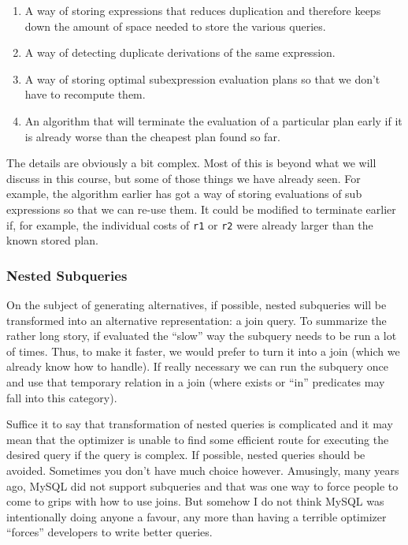 \documentclass[a4paper]{report}
\begin{document}
\begin{enumerate}
	\item A way of storing expressions that reduces duplication and therefore keeps down the amount of space needed to store the various queries.
	\item A way of detecting duplicate derivations of the same expression.
	\item A way of storing optimal subexpression evaluation plans so that we don't have to recompute them.
	\item An algorithm that will terminate the evaluation of a particular plan early if it is already worse than the cheapest plan found so far.
\end{enumerate}

The details are obviously a bit complex. Most of this is beyond what we will discuss in this course, but some of those things we have already seen. For example, the algorithm earlier has got a way of storing evaluations of sub expressions so that we can re-use them. It could be modified to terminate earlier if, for example, the individual costs of \texttt{r1} or \texttt{r2} were already larger than the known stored plan.

\subsubsection*{Nested Subqueries}

On the subject of generating alternatives, if possible, nested subqueries will be transformed into an alternative representation: a join query. To summarize the rather long story, if evaluated the ``slow'' way the subquery needs to be run a lot of times. Thus, to make it faster, we would prefer to turn it into a join (which we already know how to handle). If really necessary we can run the subquery once and use that temporary relation in a join (where exists or ``in'' predicates may fall into this category).

Suffice it to say that transformation of nested queries is complicated and it may mean that the optimizer is unable to find some efficient route for executing the desired query if the query is complex. If possible, nested queries should be avoided. Sometimes you don't have much choice however. Amusingly, many years ago, MySQL did not support subqueries and that was one way to force people to come to grips with how to use joins. But somehow I do not think MySQL was intentionally doing anyone a favour, any more than having a terrible optimizer ``forces'' developers to write better queries. 
\end{document}
